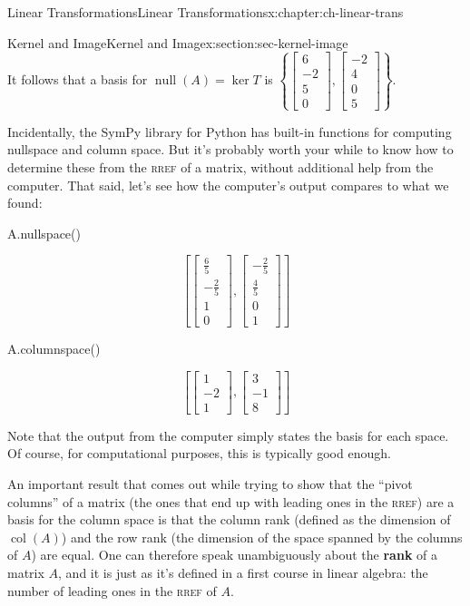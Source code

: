 \documentclass[oneside,10pt,]{book}
\newcommand{\initialism}[1]{\textsc{\MakeLowercase{#1}}}
\newcommand{\terminology}[1]{\textbf{#1}}
\numberwithin{equation}{section}
\newcommand{\bbm}{\begin{bmatrix}}
\newcommand{\ebm}{\end{bmatrix}}
\newcommand{\nll}{\operatorname{null}}
\newcommand{\csp}{\operatorname{col}}
\begin{document}
\begin{chapterptx}{Linear Transformations}{}{Linear Transformations}{}{}{x:chapter:ch-linear-trans}
\begin{sectionptx}{Kernel and Image}{}{Kernel and Image}{}{}{x:section:sec-kernel-image}
\begin{equation*}
\end{equation*}
It follows that a basis for \(\nll(A)=\ker T\) is \(\left\{\bbm 6\\-2\\5\\0\ebm, \bbm -2\\4\\0\\5\ebm\right\}\).%
\par
Incidentally, the SymPy library for Python has built-in functions for computing nullspace and column space. But it's probably worth your while to know how to determine these from the \initialism{RREF} of a matrix, without additional help from the computer. That said, let's see how the computer's output compares to what we found:%
\begin{sageinput}
A.nullspace()
\end{sageinput}
\begin{sageoutput}
\[\left[\bbm \frac65\\-\frac25\\1\\0\ebm, \bbm -\frac25\\ \frac45\\0\\1\ebm\right]\]
\end{sageoutput}
\begin{sageinput}
A.columnspace()
\end{sageinput}
\begin{sageoutput}
\[\left[\bbm 1\\-2\\1\ebm, \bbm 3\\-1\\8\ebm\right]\]
\end{sageoutput}
Note that the output from the computer simply states the basis for each space. Of course, for computational purposes, this is typically good enough.%
\par
An important result that comes out while trying to show that the ``pivot columns'' of a matrix (the ones that end up with leading ones in the \initialism{RREF}) are a basis for the column space is that the column rank (defined as the dimension of \(\csp(A)\)) and the row rank (the dimension of the space spanned by the columns of \(A\)) are equal. One can therefore speak unambiguously about the \terminology{rank} of a matrix \(A\), and it is just as it's defined in a first course in linear algebra: the number of leading ones in the \initialism{RREF} of \(A\).%
\par

\end{sectionptx}
\end{chapterptx}
\end{document}
